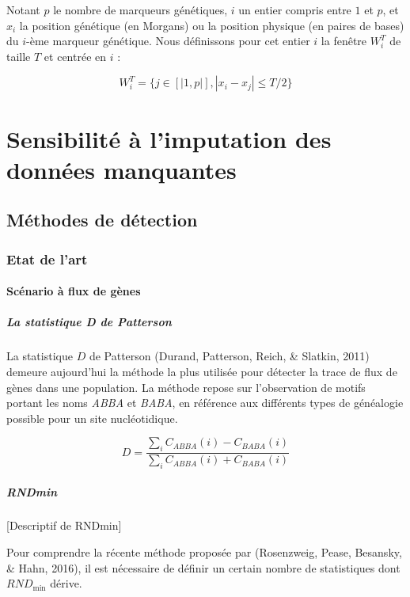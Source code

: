 \documentclass[12pt,twoside]{ugathesis}
\begin{document}
Notant \(p\) le nombre de marqueurs génétiques, \(i\) un entier compris
entre \(1\) et \(p\), et \(x_i\) la position génétique (en Morgans) ou
la position physique (en paires de bases) du \(i\)-ème marqueur
génétique. Nous définissons pour cet entier \(i\) la fenêtre \(W_i^T\)
de taille \(T\) et centrée en \(i\) :

\[W_i^T = \{ j \in [|1, p|], |x_i - x_j| \leq T/2 \}\]

\section{Sensibilité à l'imputation des données
manquantes}\label{sensibilite-a-limputation-des-donnees-manquantes}

\newpage

\subsection{Méthodes de détection}\label{methodes-de-detection}

\subsubsection{Etat de l'art}\label{etat-de-lart-1}

\paragraph{Scénario à flux de gènes}\label{scenario-a-flux-de-genes}

\subparagraph{La statistique D de
Patterson}\label{la-statistique-d-de-patterson}

La statistique \(D\) de Patterson (Durand, Patterson, Reich, \& Slatkin,
2011) demeure aujourd'hui la méthode la plus utilisée pour détecter la
trace de flux de gènes dans une population. La méthode repose sur
l'observation de motifs portant les noms \emph{ABBA} et \emph{BABA}, en
référence aux différents types de généalogie possible pour un site
nucléotidique.

\[ D = \displaystyle \frac{\sum_i C_{ABBA}(i) - C_{BABA}(i)}{\sum_i C_{ABBA}(i) + C_{BABA}(i)} \]

\subparagraph{RNDmin}\label{rndmin}

{[}Descriptif de RNDmin{]}

Pour comprendre la récente méthode proposée par (Rosenzweig, Pease,
Besansky, \& Hahn, 2016), il est nécessaire de définir un certain nombre
de statistiques dont \(RND_{\text{min}}\) dérive.
\end{document}

